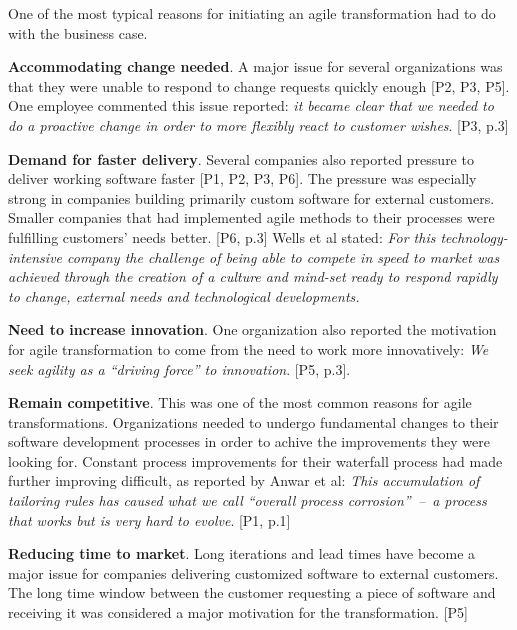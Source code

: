 One of the most typical reasons for initiating an agile transformation
had to do with the business case.

{\bfseries Accommodating change needed}. A major issue for several
organizations was that they were unable to respond to change requests
quickly enough [P2, P3, P5]. One employee commented this issue reported:
\textit{it became clear that we needed to do a proactive change in order
to more flexibly react to customer wishes}. [P3, p.3]

{\bfseries Demand for faster delivery}. Several companies also reported
pressure to deliver working software faster [P1, P2, P3, P6]. The
pressure was especially strong in companies building primarily custom
software for external customers. Smaller companies that had implemented
agile methods to their processes were fulfilling customers' needs
better. [P6, p.3] Wells et al stated: \textit{For this technology{-}intensive
company the challenge of being able to compete in speed to market was
achieved through the creation of a culture and mind-set ready to respond
rapidly to change, external needs and technological developments.}

{\bfseries Need to increase innovation}. One organization also reported
the motivation for agile transformation to come from the need to work
more innovatively: \textit{We seek agility as a ``driving force'' to
innovation}. [P5, p.3].

{\bfseries Remain competitive}. This was one of the most common reasons for
agile transformations. Organizations needed to undergo fundamental changes to
their software development processes in order to achive the improvements they
were looking for. Constant process improvements for their waterfall process had
made further improving difficult, as reported by Anwar et al: \textit{This
accumulation of tailoring rules has caused what we call ``overall process
corrosion'' – a process that works but is very hard to evolve}. [P1, p.1]

{\bfseries Reducing time to market}. Long iterations and lead times have become
a major issue for companies delivering customized software to external
customers. The long time window between the customer requesting a piece of
software and receiving it was considered a major motivation for the
transformation. [P5]
